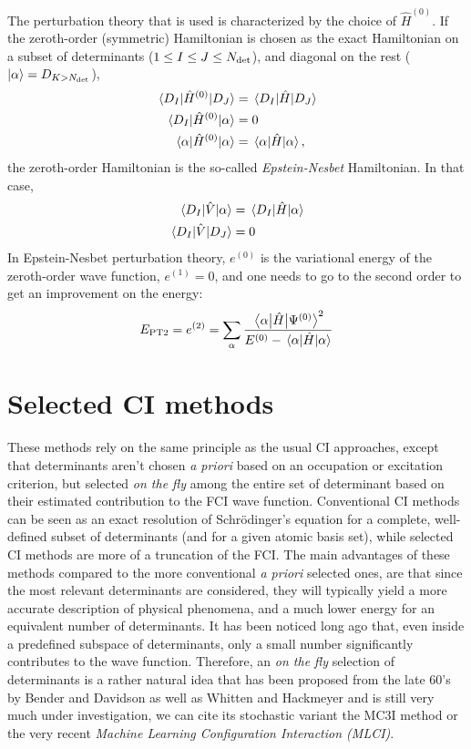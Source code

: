 \documentclass[./thesis.tex]{subfiles}
\begin{document}
The perturbation theory that is used is characterized by the choice of $\hat{H}^{(0)}$.
If the zeroth-order (symmetric) Hamiltonian is chosen as the exact Hamiltonian on a subset of determinants ($1 \le I \le J \le {N_\text{det}}$), and diagonal on the rest (${\ket{\alpha}} = D_{K > {N_\text{det}}}$), 
\begin{align}
\mel{D_I}{\hat{H}^{(0)}}{D_J} & = \mel{D_I}{\hat{H}}{D_J} \\
\mel{D_I}{\hat{H}^{(0)}}{\alpha} & = 0 \\
\mel{\alpha}{\hat{H}^{(0)}}{\alpha} & = \mel{\alpha}{\hat{H}}{\alpha}, \\
\end{align}
the zeroth-order Hamiltonian is the so-called \emph{Epstein-Nesbet} Hamiltonian. In that case,
\begin{align}
\mel{D_I}{\hat{V}}{\alpha} & = \mel{D_I}{\hat{H}}{\alpha} \\
\mel{D_I}{\hat{V}}{D_J} & = 0 \\
\end{align}
In Epstein-Nesbet perturbation theory, $e^{(0)}$ is the variational energy of
the zeroth-order wave function, $e^{(1)} = 0$, and one needs to go to the second
order to get an improvement on the energy:
\begin{equation}
E_\text{PT2} = e^{(2)} = \sum_{\alpha} \frac{\mel{\alpha}{\hat{H}}{\Psi^{(0)}}^2}{E^{(0)} - \mel{\alpha}{\hat{H}}{\alpha}}
\end{equation}



\section{Selected CI methods}
\label{sec:meth_cipsi}

These methods rely on the same principle as the usual CI approaches, except that determinants aren't chosen \textit{a priori} based on an occupation or excitation criterion, but selected \emph{on the fly} among the entire set of determinant based on their estimated contribution to the FCI wave function. Conventional CI methods can be seen as an exact resolution of Schrödinger's equation for a complete, well-defined subset of determinants (and for a given atomic basis set), while selected CI methods are more of a truncation of the FCI.
The main advantages of these methods compared to the more conventional \textit{a priori} selected ones, are that since the most relevant determinants are considered, they will typically yield a more accurate description of physical phenomena, and a much lower energy for an equivalent number of determinants.
It has been noticed long ago that, even inside a predefined subspace of determinants, only a small number significantly contributes to the wave function.\cite{Bytautas_2009,Anderson_2018} Therefore, an \emph{on the fly} selection of determinants is a rather natural idea that has been proposed from the late 60's by Bender and Davidson\cite{Bender_1969} as well as Whitten and Hackmeyer\cite{Whitten_1969} and is still very much under investigation, we can cite its stochastic variant the MC3I method\cite{Ohtsuka_2017} or the very recent \emph{Machine Learning Configuration Interaction (MLCI)}.\cite{1808.05787}
\end{document}
